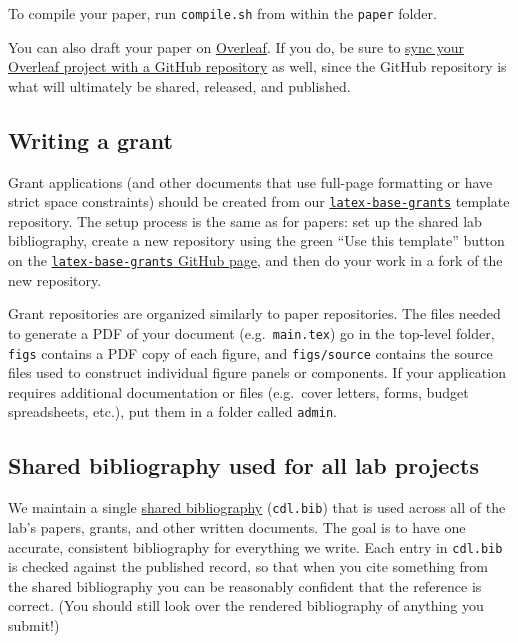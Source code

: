 \documentclass{tufte-book} %
\begin{document}
To compile your paper, run \texttt{compile.sh} from within the
\texttt{paper} folder.

You can also draft your paper on
\href{https://www.overleaf.com/}{Overleaf}.  If you do, be sure to
\href{https://docs.overleaf.com/integrations-and-add-ons/git-integration-and-github-synchronization/github-synchronization}{sync
  your Overleaf project with a GitHub repository} as well, since the
GitHub repository is what will ultimately be shared, released, and
published.

\subsection{Writing a grant}
Grant applications (and other documents that use full-page formatting
or have strict space constraints) should be created from our
\href{https://github.com/ContextLab/latex-base-grants}{\texttt{latex-base-grants}}
template repository.  The setup process is the same as for papers: set
up the shared lab bibliography, create a new repository using the
green ``Use this template'' button on the
\href{https://github.com/ContextLab/latex-base-grants}{\texttt{latex-base-grants}
  GitHub page}, and then do your work in a fork of the new repository.

Grant repositories are organized similarly to paper repositories.  The
files needed to generate a PDF of your document (e.g.\
\texttt{main.tex}) go in the top-level folder, \texttt{figs} contains
a PDF copy of each figure, and \texttt{figs/source} contains the
source files used to construct individual figure panels or components.
If your application requires additional documentation or files (e.g.\
cover letters, forms, budget spreadsheets, etc.), put them in a folder
called \texttt{admin}.

\subsection{Shared bibliography used for all lab projects}
\label{sec:bibliography}
  We
maintain a single
\href{https://github.com/ContextLab/CDL-bibliography}{shared
  bibliography} (\texttt{cdl.bib}) that is used across all of the
lab's papers, grants, and other written documents.  The goal is to
have one accurate, consistent bibliography for everything we write.
Each entry in \texttt{cdl.bib} is checked against the published
record, so that when you cite something from the shared bibliography
you can be reasonably confident that the reference is correct.  (You
should still look over the rendered bibliography of anything you
submit!)
\end{document}
